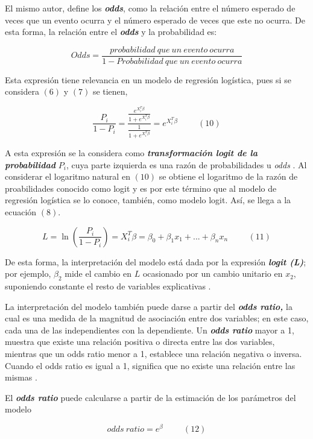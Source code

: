 \documentclass[
  letterpaper,
]{tex/svmono}
\begin{document}
El mismo autor, define los \textbf{\emph{odds}}, como la relación entre
el número esperado de veces que un evento ocurra y el número esperado de
veces que este no ocurra. De esta forma, la relación entre el
\textbf{\emph{odds}} y la probabilidad es:

\[
Odds = \frac{probabilidad~que~un~evento~ocurra}{1 - Probabilidad~que~un~evento~ocurra}
\]

Esta expresión tiene relevancia en un modelo de regresión logística,
pues si se considera \((6)\) y \((7)\) se tienen,

\[
\frac{P_i}{1- P_i} = \frac{\frac{e^{X_i^T\beta}}{1 + e^{X_i^T\beta}}}{\frac{1}{1 + e^{X_i^T\beta}}} = e^{X_i^T\beta}\hspace{1cm} (10) 
\]

A esta expresión se la considera como \textbf{\emph{transformación logit
de la probabilidad}} \(P_i\), cuya parte izquierda es una razón de
probabilidades u \emph{odds} \citep{Flórez}. Al considerar el logaritmo
natural en \((10)\) se obtiene el logaritmo de la razón de proabilidades
conocido como logit y es por este término que al modelo de regresión
logística se lo conoce, también, como modelo logit. Así, se llega a la
ecuación \((8)\).

\[
L = \ln\left(\frac{P_i}{1 - P_i}\right) = X_i^T\beta = \beta_0 + \beta_1x_1 + . . . + \beta_nx_n\hspace{1cm}(11)
\]

De esta forma, la interpretación del modelo está dada por la expresión
\textbf{\emph{logit (L)}}; por ejemplo, \(\beta_2\) mide el cambio en
\(L\) ocasionado por un cambio unitario en \(x_2\), suponiendo constante
el resto de variables explicativas \citep{Guajarati}.

La interpretación del modelo también puede darse a partir del
\textbf{\emph{odds ratio,}} la cual es una medida de la magnitud de
asociación entre dos variables; en este caso, cada una de las
independientes con la dependiente. Un \textbf{\emph{odds ratio}} mayor a
1, muestra que existe una relación positiva o directa entre las dos
variables, mientras que un odds ratio menor a 1, establece una relación
negativa o inversa. Cuando el odds ratio es igual a 1, significa que no
existe una relación entre las mismas \citep{Salas}.

El \textbf{\emph{odds ratio}} puede calcularse a partir de la estimación
de los parámetros del modelo

\[
odds~ratio = e^\beta\hspace{1cm}(12)
\]
\end{document}

